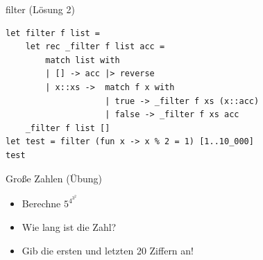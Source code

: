 \documentclass[t]{beamer}
\begin{document}
\begin{frame}[label={sec:org5190aa3},fragile]{filter (Lösung 2)}
 \begin{verbatim}
let filter f list = 
    let rec _filter f list acc = 
        match list with
        | [] -> acc |> reverse
        | x::xs ->  match f x with
                    | true -> _filter f xs (x::acc)
                    | false -> _filter f xs acc
    _filter f list []
let test = filter (fun x -> x % 2 = 1) [1..10_000]
test
\end{verbatim}
\end{frame}

\begin{frame}[label={sec:orgaadbeea}]{Große Zahlen (Übung)}
\begin{itemize}
\item Berechne \(5^{4^{3^2}}\)
\item Wie lang ist die Zahl?
\item Gib die ersten und letzten 20 Ziffern an!
\end{itemize}
\end{frame}
\end{document}
